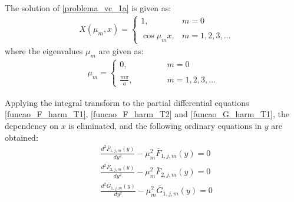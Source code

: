 \documentclass[conference,compsoc,fleqn]{IEEEtran}
\begin{document}
The solution of \eqref{problema_vc_1a} is given as\cite{livro_integral_transforms_cotta}:
\begin{align}
& X(\mu_m, x) = \left\lbrace
\begin{array}{ll}
1, & m = 0 \\ \\
\cos \mu_m x, & m = 1,2,3,\ldots
\end{array}
\right . \label{definicao_das_autofuncoes}
\end{align}
where the eigenvalues $\mu_m$ are given as\cite{livro_integral_transforms_cotta}:
\begin{align}
\mu_m = \left\lbrace
\begin{array}{ll}
0, \quad\quad\quad\quad & m = 0 \\ \\
\frac{m\pi}{a}, & m = 1,2,3,\ldots
\end{array}
\right.
\end{align}

Applying the integral transform to the partial differential equations \eqref{funcao_F_harm_T1}, \eqref{funcao_F_harm_T2} and \eqref{funcao_G_harm_T1}, the dependency on $x$ is eliminated, and the following ordinary equations in $y$ are obtained:
\begin{align}
& \frac{d^2 \bar{F}_{1,j,m}(y)}{d y^2}
-
\mu_m^2 \bar{F}_{1,j,m}(y) = 0 \label{eq_dif_ord_F1} \\
& \frac{d^2 \bar{F}_{2,j,m}(y)}{d y^2}
-
\mu_m^2 \bar{F}_{2,j,m}(y) = 0 \label{eq_dif_ord_F2} \\
& \frac{d^2 \bar{G}_{1,j,m}(y)}{d y^2}
-
\mu_m^2 \bar{G}_{1,j,m}(y) = 0 \label{eq_dif_ord_G1}
\end{align}
\end{document}
